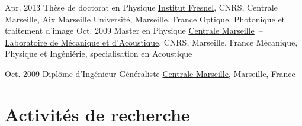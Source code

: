 \documentclass[]{cv} %
\begin{document}
\begin{entrylist}
\entry
{Apr. 2013}
{Thèse de doctorat {\normalfont en Physique}}
{\href{http://www.fresnel.fr/spip/}{Institut Fresnel}, CNRS, Centrale Marseille, Aix Marseille Universit\'e, Marseille, France}
{Optique, Photonique et traitement d'image}
\entry
{Oct. 2009}
{Master {\normalfont en Physique}}
{\href{http://www.centrale-marseille.fr/}{Centrale Marseille}~--~
\href{http://www.lma.cnrs-mrs.fr/}{Laboratoire de Mécanique et d'Acoustique}, CNRS, Marseille, France}
{Mécanique, Physique et Ingéniérie, specialisation en Acoustique}

\entry
{Oct. 2009}
{Diplôme d'{Ingénieur Généraliste}}
{\href{http://www.centrale-marseille.fr/}{Centrale Marseille}, Marseille, France}
{}
\end{entrylist}

\vspace*{-0.2cm}
\section{Activités de recherche}
\end{document}
